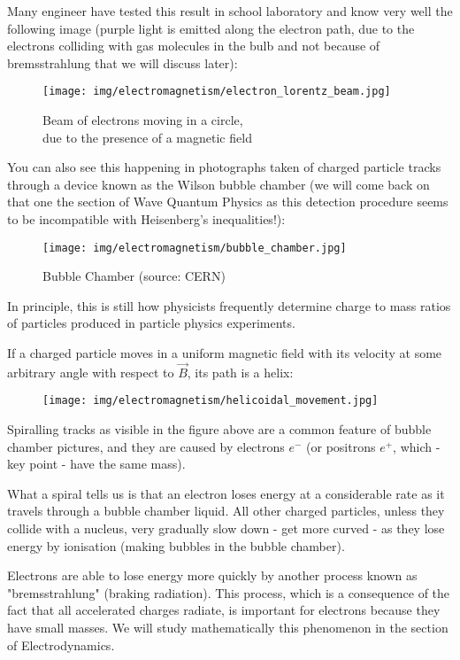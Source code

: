 	Many engineer have tested this result in school laboratory and know very well the following image (purple light is emitted along the electron path, due to the electrons colliding with gas molecules in the bulb and not because of bremsstrahlung that we will discuss later):
	\begin{figure}[H]
		\centering
		\texttt{[image: img/electromagnetism/electron\_lorentz\_beam.jpg]}
		\caption{Beam of electrons moving in a circle,\\ due to the presence of a magnetic field}
	\end{figure}
	You can also see this happening in photographs taken of charged particle tracks through a device known as the Wilson bubble chamber (we will come back on that one the section of Wave Quantum Physics as this detection procedure seems to be incompatible with Heisenberg's inequalities!): 
	\begin{figure}[H]
		\centering
		\texttt{[image: img/electromagnetism/bubble\_chamber.jpg]}
		\caption[Bubble Chamber]{Bubble Chamber (source: CERN)}
	\end{figure}
	In principle, this is still how physicists frequently determine charge to mass ratios of particles produced in particle physics experiments.
	
	If a charged particle moves in a uniform magnetic field with its velocity at some
arbitrary angle with respect to $\vec{B}$, its path is a helix:
	\begin{figure}[H]
		\centering
		\texttt{[image: img/electromagnetism/helicoidal\_movement.jpg]}
	\end{figure}
	Spiralling tracks as visible in the figure above are a common feature of bubble chamber pictures, and they are caused by electrons $e^{-}$ (or positrons  $e^{+}$, which - key point - have the same mass).

	What a spiral tells us is that an electron loses energy at a considerable rate as it travels through a bubble chamber liquid. All other charged particles, unless they collide with a nucleus, very gradually slow down - get more curved - as they lose energy by ionisation (making bubbles in the bubble
chamber).

	Electrons are able to lose energy more quickly by another process known as "bremsstrahlung" (braking radiation). This process, which is a consequence of the fact that all accelerated charges radiate, is important for electrons because they have small masses. We will study mathematically this phenomenon in the section of Electrodynamics.
	

